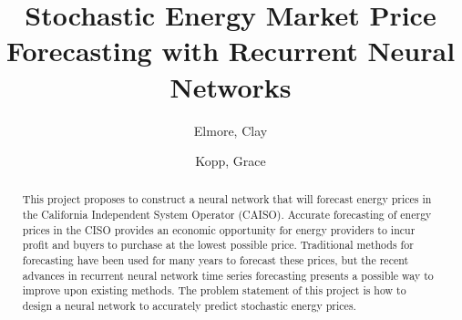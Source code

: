 \documentclass[sigconf]{acmart}
\begin{document}
%

%
\title{Stochastic Energy Market Price Forecasting with Recurrent Neural Networks}

%

\author{Elmore, Clay}

\author{Kopp, Grace}
%
\renewcommand{\shortauthors}{Elmore and Kopp, et al.}

\begin{abstract}
This project proposes to construct a neural network that will forecast energy prices in the California Independent System Operator (CAISO). Accurate forecasting of energy prices in the CISO provides an economic opportunity for energy providers to incur profit and buyers to purchase at the lowest possible price. Traditional methods for forecasting have been used for many years to forecast these prices, but the recent advances in recurrent neural network time series forecasting presents a possible way to improve upon existing methods. The problem statement of this project is how to design a neural network to accurately predict stochastic energy prices.
\end{abstract}
\end{document}
